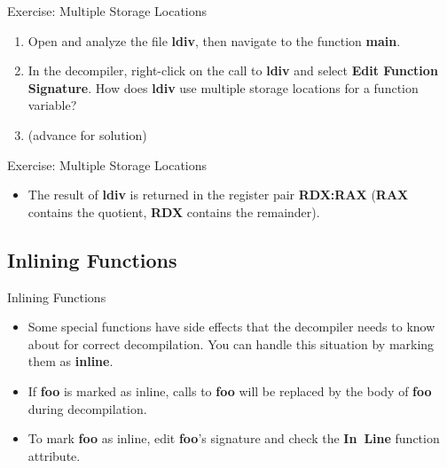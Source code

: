 \documentclass{beamer}
\begin{document}
\begin{frame}
\begin{block}{Exercise: Multiple Storage Locations}
\begin{enumerate}
\item Open and analyze the file \textbf{ldiv}, then navigate to the function \textbf{main}.
\item In the decompiler, right-click on the call to \textbf{ldiv} and select \textbf{Edit Function Signature}.  How does \textbf{ldiv} use multiple storage locations for a function variable?\item[] (advance for solution)
\end{enumerate}
\end{block}
\end{frame}

\begin{frame}
\begin{block}{Exercise: Multiple Storage Locations}
\begin{itemize}
\item The result of \textbf{ldiv} is returned in the register pair \textbf{RDX:RAX} (\textbf{RAX} contains the quotient, \textbf{RDX} contains the remainder).
\end{itemize}
\end{block}
\end{frame}

\subsection{Inlining Functions}

\begin{frame}
\begin{block}{Inlining Functions}
\begin{itemize}
\item Some special functions have side effects that the decompiler needs to know about for correct decompilation. You can handle this situation by marking them
as \textbf{inline}.
\item If \textbf{foo} is marked as inline, calls to \textbf{foo} will be replaced by the body of \textbf{foo} during decompilation.
\item To mark \textbf{foo} as inline, edit \textbf{foo}'s signature and check the \textbf{In~Line} function attribute.
\end{itemize}
\end{block}
\end{frame}
\end{document}
